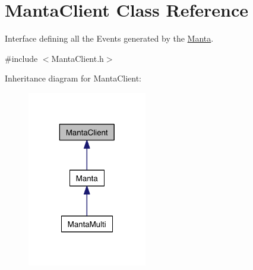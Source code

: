 \hypertarget{classMantaClient}{\section{\-Manta\-Client \-Class \-Reference}
\label{classMantaClient}
}


\-Interface defining all the \-Events generated by the \hyperlink{classManta}{\-Manta}.  




{\ttfamily \#include $<$\-Manta\-Client.\-h$>$}



\-Inheritance diagram for \-Manta\-Client\-:
\nopagebreak
\begin{figure}[H]
\begin{center}
\leavevmode
\includegraphics[width=148pt]{classMantaClient__inherit__graph}
\end{center}
\end{figure}
